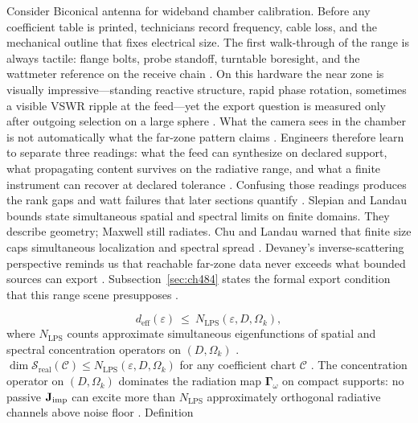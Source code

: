 \begin{physicalvignette}
Consider Biconical antenna for wideband chamber calibration. Before any coefficient table is printed, technicians record frequency, cable loss, and the mechanical outline that fixes electrical size. The first walk-through of the range is always tactile: flange bolts, probe standoff, turntable boresight, and the wattmeter reference on the receive chain \cite{hansen1988}.
On this hardware the near zone is visually impressive---standing reactive structure, rapid phase rotation, sometimes a visible VSWR ripple at the feed---yet the export question is measured only after outgoing selection on a large sphere \cite{harrington2001}. What the camera sees in the chamber is not automatically what the far-zone pattern claims \cite{stratton1941}.
Engineers therefore learn to separate three readings: what the feed can synthesize on declared support, what propagating content survives on the radiative range, and what a finite instrument can recover at declared tolerance \cite{devaney2004}. Confusing those readings produces the rank gaps and watt failures that later sections quantify \cite{pal2026}.
Slepian and Landau bounds state simultaneous spatial and spectral limits on finite domains. They describe geometry; Maxwell still radiates.
Chu and Landau warned that finite size caps simultaneous localization and spectral spread \cite{chu1948}. Devaney's inverse-scattering perspective reminds us that reachable far-zone data never exceeds what bounded sources can export \cite{devaney2004}.
Subsection~\ref{sec:ch484} states the formal export condition that this range scene presupposes \cite{stratton1941}.
\end{physicalvignette}
\begin{equation}
\label{eq:ch4.lps-nwidth-bound}
d_{\mathrm{eff}}(\varepsilon)\ \le\ N_{\mathrm{LPS}}(\varepsilon,D,\Omega_{k}),
\end{equation}
where \(N_{\mathrm{LPS}}\) counts approximate simultaneous eigenfunctions of spatial and spectral concentration operators on \((D,\Omega_{k})\)
\cite{harrington2001}.
\label{thm:ch4.lps-synthesis-bound}
\(\dim\mathcal{S}_{\mathrm{real}}(\mathcal{C})\le N_{\mathrm{LPS}}(\varepsilon,D,\Omega_{k})\) for any coefficient chart \(\mathcal{C}\)
\cite{stratton1941}.
The concentration operator on \((D,\Omega_{k})\) dominates the radiation map \(\boldsymbol{\Gamma}_\omega\) on compact supports: no passive
\(\mathbf{J}_{\mathrm{imp}}\) can excite more than \(N_{\mathrm{LPS}}\) approximately orthogonal radiative channels above noise floor \cite{hansen1988}. Definition
